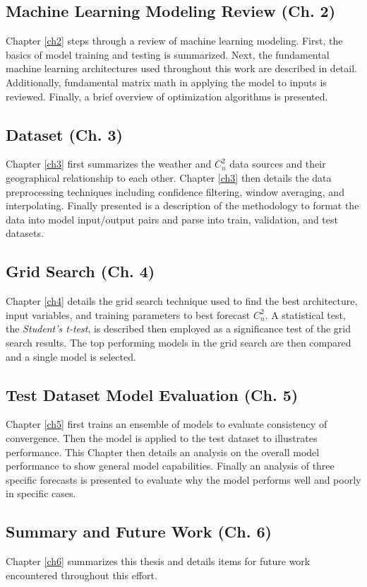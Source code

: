 \subsection{Machine Learning Modeling Review (Ch. 2)}
Chapter \ref{ch2} steps through a review of machine learning modeling. First, the basics of model training and testing is summarized. Next, the fundamental machine learning architectures used throughout this work are described in detail. Additionally, fundamental matrix math in applying the model to inputs is reviewed.  Finally, a brief overview of optimization algorithms is presented.

\subsection{Dataset (Ch. 3)}
Chapter \ref{ch3} first summarizes the weather and $C_{n}^{2}$ data sources and their geographical relationship to each other. Chapter \ref{ch3} then details the data preprocessing techniques including confidence filtering, window averaging, and interpolating. Finally presented is a description of the methodology to format the data into model input/output pairs and parse into train, validation, and test datasets.

\subsection{Grid Search (Ch. 4)}
Chapter \ref{ch4} details the grid search technique used to find the best architecture, input variables, and training parameters to best forecast $C_{n}^{2}$. A statistical test, the \textit{Student's t-test}, is described then employed as a significance test of the grid search results. The top performing models in the grid search are then compared and a single model is selected.

\subsection{Test Dataset Model Evaluation (Ch. 5)}
Chapter \ref{ch5} first trains an ensemble of models to evaluate consistency of convergence. Then the model is applied to the test dataset to illustrates performance. This Chapter then details an analysis on the overall model performance to show general model capabilities. Finally an analysis of three specific forecasts is presented to evaluate why the model performs well and poorly in specific cases.

\subsection{Summary and Future Work (Ch. 6)}
Chapter \ref{ch6} summarizes this thesis and details items for future work encountered throughout this effort.